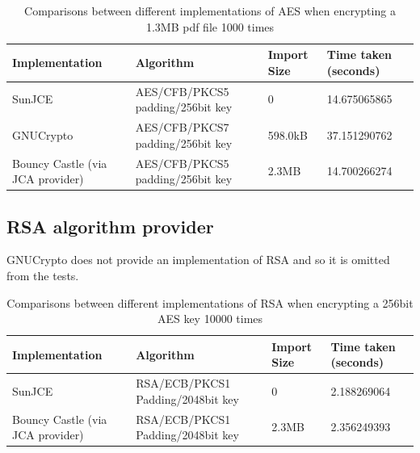 \documentclass[10pt, titlepage]{article}
\begin{document}
\begin{center}
\begin{table}
    \begin{tabular}{ | l | l | l | l |}
    \hline
    Implementation & Algorithm & Import Size & Time taken (seconds) \\ \hline
    
    SunJCE & AES/CFB/PKCS5 padding/256bit key & 0 & 14.675065865 \\ \hline
    
    GNUCrypto & AES/CFB/PKCS7 padding/256bit key & 598.0kB & 37.151290762 \\ \hline
    
     Bouncy Castle (via JCA provider) & AES/CFB/PKCS5 padding/256bit key & 2.3MB & 14.700266274 \\ \hline
    
    \end{tabular}
    \caption{Comparisons between different implementations of AES when encrypting a 1.3MB pdf file 1000 times} \label{tab:aesComparison}
    \end{table}
\end{center}

\subsection*{RSA algorithm provider}
GNUCrypto does not provide an implementation of RSA and so it is omitted from the tests.

\begin{center}
\begin{table}
    \begin{tabular}{ | l | l | l | l |}
    \hline
    Implementation & Algorithm & Import Size & Time taken (seconds) \\ \hline
    
    SunJCE & RSA/ECB/PKCS1 Padding/2048bit key & 0 & 2.188269064 \\ \hline
    
     Bouncy Castle (via JCA provider) & RSA/ECB/PKCS1 Padding/2048bit key & 2.3MB & 2.356249393 \\ \hline
    
    \end{tabular}
    \caption{Comparisons between different implementations of RSA when encrypting a 256bit AES key 10000 times} \label{tab:rsaComparison}
    \end{table}
\end{center}
\end{document}
